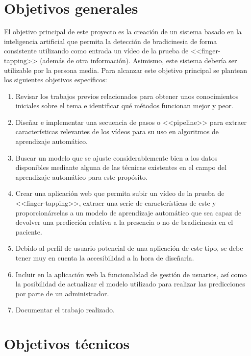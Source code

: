 \label{cha:Objetivos del proyecto}

\section{Objetivos generales}

El objetivo principal de este proyecto es la creación de un sistema basado en la
inteligencia artificial que permita la detección de bradicinesia de forma
consistente utilizando como entrada un vídeo de la prueba de <<finger-tapping>>
(además de otra información). Asimismo, este sistema debería ser utilizable por
la persona media. Para alcanzar este objetivo principal se plantean los
siguientes objetivos específicos:

\begin{enumerate}
    \item Revisar los trabajos previos relacionados para obtener unos
    conocimientos iniciales sobre el tema e identificar qué métodos funcionan
    mejor y peor.
    \item Diseñar e implementar una secuencia de pasos o <<pipeline>> para
    extraer características relevantes de los vídeos para su uso en algoritmos
    de aprendizaje automático.
    \item Buscar un modelo que se ajuste considerablemente bien a los datos
    disponibles mediante alguna de las técnicas existentes en el campo del
    aprendizaje automático para este propósito.
    \item Crear una aplicación web que permita subir un vídeo de la prueba de
    <<finger-tapping>>, extraer una serie de características de este y
    proporcionárselas a un modelo de aprendizaje automático que sea capaz de
    devolver una predicción relativa a la presencia o no de bradicinesia en el
    paciente.
    \item Debido al perfil de usuario potencial de una aplicación de este tipo,
    se debe tener muy en cuenta la accesibilidad a la hora de diseñarla.
    \item Incluir en la aplicación web la funcionalidad de gestión de usuarios,
    así como la posibilidad de actualizar el modelo utilizado para realizar las
    predicciones por parte de un administrador.
    \item Documentar el trabajo realizado.
\end{enumerate}

\section{Objetivos técnicos}

